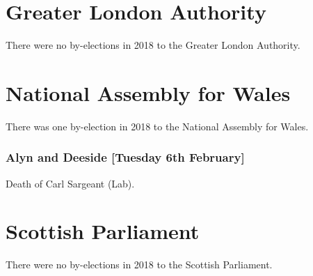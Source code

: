 \documentclass[a4paper,openany]{book}
\begin{document}
\section{Greater London Authority}

There were no by-elections in 2018 to the Greater London Authority.


\section{National Assembly for Wales}

There was one by-election in 2018 to the National Assembly for Wales.

\subsubsection*{Alyn and Deeside \hspace*{\fill}\nolinebreak[1]%
\enspace\hspace*{\fill}
[Tuesday 6th February]}


Death of Carl Sargeant (Lab).

\section{Scottish Parliament}

There were no by-elections in 2018 to the Scottish Parliament.
%
%
%
%
%
%
%
\end{document}
